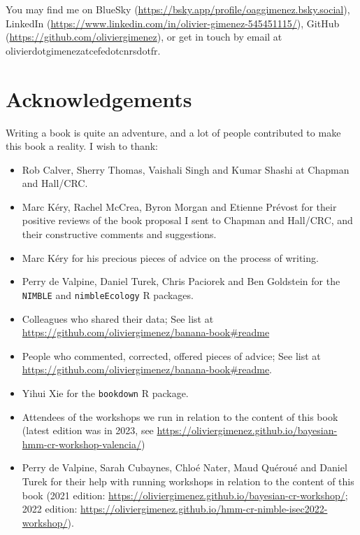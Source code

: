 \documentclass[
  12pt,
]{krantz}
\providecommand{\tightlist}{%
  \setlength{\itemsep}{0pt}\setlength{\parskip}{0pt}}
\begin{document}
You may find me on BlueSky (\url{https://bsky.app/profile/oaggimenez.bsky.social}), LinkedIn (\url{https://www.linkedin.com/in/olivier-gimenez-545451115/}), GitHub (\url{https://github.com/oliviergimenez}), or get in touch by email at olivier\textbar dot\textbar gimenez\textbar at\textbar cefe\textbar dot\textbar cnrs\textbar dot\textbar fr.

\section*{Acknowledgements}\label{acknowledgements}


Writing a book is quite an adventure, and a lot of people contributed to make this book a reality. I wish to thank:

\begin{itemize}
\tightlist
\item
  Rob Calver, Sherry Thomas, Vaishali Singh and Kumar Shashi at Chapman and Hall/CRC.\\
\item
  Marc Kéry, Rachel McCrea, Byron Morgan and Etienne Prévost for their positive reviews of the book proposal I sent to Chapman and Hall/CRC, and their constructive comments and suggestions.\\
\item
  Marc Kéry for his precious pieces of advice on the process of writing.\\
\item
  Perry de Valpine, Daniel Turek, Chris Paciorek and Ben Goldstein for the \texttt{NIMBLE} and \texttt{nimbleEcology} R packages.\\
\item
  Colleagues who shared their data; See list at \url{https://github.com/oliviergimenez/banana-book\#readme}
\item
  People who commented, corrected, offered pieces of advice; See list at \url{https://github.com/oliviergimenez/banana-book\#readme}.
\item
  Yihui Xie for the \texttt{bookdown} R package.
\item
  Attendees of the workshops we run in relation to the content of this book (latest edition was in 2023, see \url{https://oliviergimenez.github.io/bayesian-hmm-cr-workshop-valencia/})
\item
  Perry de Valpine, Sarah Cubaynes, Chloé Nater, Maud Quéroué and Daniel Turek for their help with running workshops in relation to the content of this book (2021 edition: \url{https://oliviergimenez.github.io/bayesian-cr-workshop/}; 2022 edition: \url{https://oliviergimenez.github.io/hmm-cr-nimble-isec2022-workshop/}).\\

\end{itemize}
\end{document}
